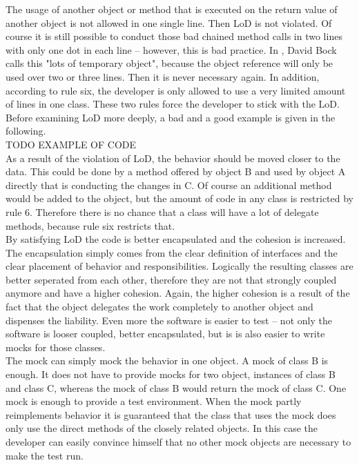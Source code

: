 The usage of another object or method that is executed on the return value of another object is not allowed in one single line. Then \ac{LoD} is not violated. Of course it is still possible to conduct those bad chained method calls in two lines with only one dot in each line -- however, this is bad practice. In \cite{paperboy}, David Bock calls this "lots of temporary object", because the object reference will only be used over two or three lines. Then it is never necessary again. In addition, according to rule six, the developer is only allowed to use a very limited amount of lines in one class. These two rules force the developer to stick with the \ac{LoD}.
\\

Before examining \ac{LoD} more deeply, a bad and a good example is given in the following. 
\\

TODO EXAMPLE OF CODE
\\

As a result of the violation of \ac{LoD}, the behavior should be moved closer to the data. This could be done by a method offered by object B and used by object A directly that is conducting the changes in C. Of course an additional method would be added to the object, but the amount of code in any class is restricted by rule 6. Therefore there is no chance that a class will have a lot of delegate methods, because rule six restricts that. 
\\

By satisfying \ac{LoD} the code is better encapsulated and the cohesion is increased. The encapsulation simply comes from the clear definition of interfaces and the clear placement of behavior and responsibilities. Logically the resulting classes are better seperated from each other, therefore they are not that strongly coupled anymore and have a higher cohesion. Again, the higher cohesion is a result of the fact that the object delegates the work completely to another object and dispenses the liability. Even more the software is easier to test -- not only the software is looser coupled, better encapsulated, but is is also easier to write mocks for those classes.
\\

The mock can simply mock the behavior in one object. A mock of class B is enough. It does not have to provide mocks for two object, instances of class B and class C, whereas the mock of class B would return the mock of class C. One mock is enough to provide a test environment. When the mock partly reimplements behavior it is guaranteed that the class that uses the mock does only use the direct methods of the closely related objects. In this case the developer can easily convince himself that no other mock objects are necessary to make the test run.
\\

